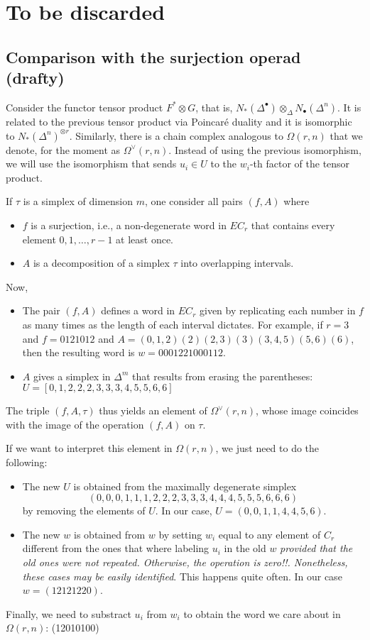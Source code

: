 
\section{To be discarded}

\subsection{Comparison with the surjection operad (drafty)}

Consider the functor tensor product $F^*\otimes G$, that is, $N_*(\Delta^\bullet)\otimes_\Delta N_\bullet(\Delta^n)$. It is related to the previous tensor product via Poincaré duality and it is isomorphic to $N_*(\Delta^n)^{\otimes r}$. Similarly, there is a chain complex analogous to $\Omega(r,n)$ that we denote, for the moment as $\Omega^\vee(r,n)$. Instead of using the previous isomorphism, we will use the isomorphism that sends $u_i\in U$ to the $w_i$-th factor of the tensor product.

If $\tau$ is a simplex of dimension $m$, one consider all pairs $(f,A)$ where
\begin{itemize}
	\item $f$ is a surjection, i.e., a non-degenerate word in $EC_r$ that contains every element $0,1,\ldots,r-1$ at least once.
	\item $A$ is a decomposition of a simplex $\tau$ into overlapping intervals.
\end{itemize}
Now,
\begin{itemize}
	\item The pair $(f,A)$ defines a word in $EC_r$ given by replicating each number in $f$ as many times as the length of each interval dictates. For example, if $r=3$ and $f= 0121012$ and $A=(0,1,2)(2)(2,3)(3)(3,4,5)(5,6)(6)$, then the resulting word is $w=0001221000112$.
	\item $A$ gives a simplex in $\Delta^m$ that results from erasing the parentheses: $U=[0,1,2,2,2,3,3,3,4,5,5,6,6]$
\end{itemize}
The triple $(f,A,\tau)$ thus yields an element of $\Omega^\vee(r,n)$, whose image coincides with the image of the operation $(f,A)$ on $\tau$.

If we want to interpret this element in $\Omega(r,n)$, we just need to do the following:
\begin{itemize}
	\item The new $U$ is obtained from the maximally degenerate simplex \[(0,0,0,1,1,1,2,2,2,3,3,3,4,4,4,5,5,5,6,6,6)\] by removing the elements of $U$. In our case, $U=(0,0,1,1,4,4,5,6)$.
	\item The new $w$ is obtained from $w$ by setting $w_i$ equal to any element of $C_r$ different from the ones that where labeling $u_i$ in the old $w$ \emph{provided that the old ones were not repeated. Otherwise, the operation is zero!!. Nonetheless, these cases may be easily identified}. This happens quite often. In our case $w=(12121220)$.
\end{itemize}
Finally, we need to substract $u_i$ from $w_i$ to obtain the word we care about in $\Omega(r,n)$: (12010100)

